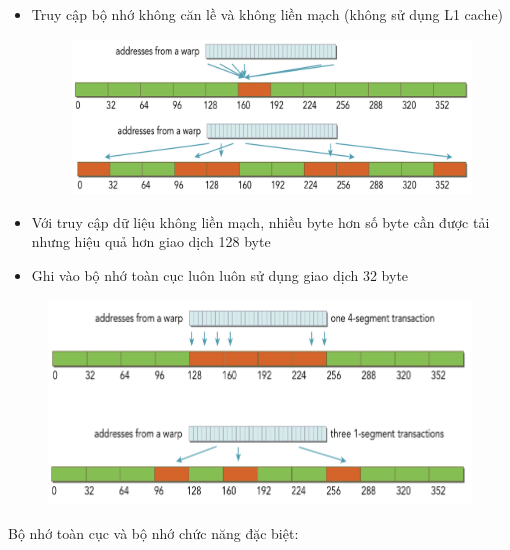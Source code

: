 \documentclass[14pt, a4paper]{article}
\numberwithin{equation}{section}
\numberwithin{figure}{section}
\numberwithin{dl}{section}
\numberwithin{md}{section}
\numberwithin{bd}{section}
\numberwithin{dn}{section}
\numberwithin{hq}{section}
\begin{document}
\begin{itemize}
    \item Truy cập bộ nhớ không căn lề và không liền mạch (không sử dụng L1 cache)
    \begin{figure}[H]
        \centering
        \includegraphics[width=0.7\linewidth]{figures/CUDA/Misaligned_Uncoalesced_Global_Memory_Transaction_3.png}
    \end{figure}
    \item Với truy cập dữ liệu không liền mạch, nhiều byte hơn số byte cần được tải nhưng hiệu quả hơn giao dịch 128 byte
\end{itemize}

\begin{itemize}
    \item Ghi vào bộ nhớ toàn cục luôn luôn sử dụng giao dịch 32 byte
\end{itemize}
\begin{figure}[H]
    \centering
    \includegraphics[width=0.7\linewidth]{figures/CUDA/Global_Memory_Write.png}
\end{figure}

Bộ nhớ toàn cục và bộ nhớ chức năng đặc biệt:
\end{document}
